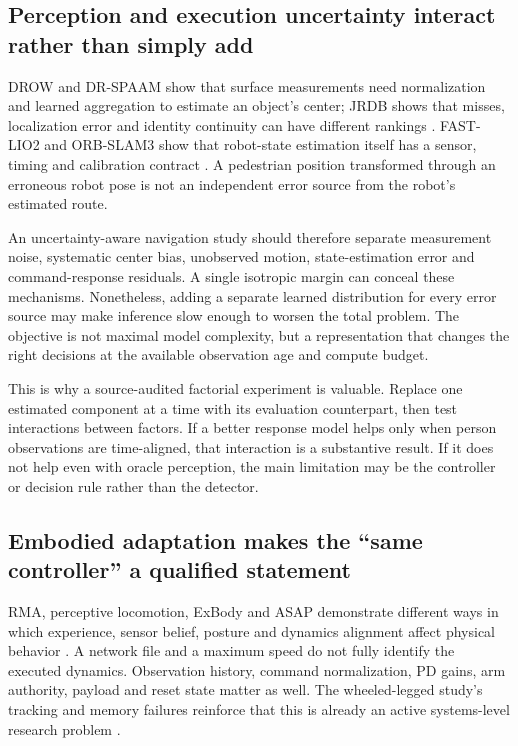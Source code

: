 \subsection{Perception and execution uncertainty interact rather than simply add}
DROW and DR-SPAAM show that surface measurements need normalization and learned
aggregation to estimate an object's center; JRDB shows that misses, localization
error and identity continuity can have different rankings
\citep{drow,drspaam,jrdb}. FAST-LIO2 and ORB-SLAM3 show that robot-state
estimation itself has a sensor, timing and calibration contract
\citep{fastlio,orbslam}. A pedestrian position transformed through an erroneous
robot pose is not an independent error source from the robot's estimated route.

An uncertainty-aware navigation study should therefore separate measurement
noise, systematic center bias, unobserved motion, state-estimation error and
command-response residuals. A single isotropic margin can conceal these
mechanisms. Nonetheless, adding a separate learned distribution for every error
source may make inference slow enough to worsen the total problem. The objective
is not maximal model complexity, but a representation that changes the right
decisions at the available observation age and compute budget.

This is why a source-audited factorial experiment is valuable. Replace one
estimated component at a time with its evaluation counterpart, then test
interactions between factors. If a better response model helps only when person
observations are time-aligned, that interaction is a substantive result. If it
does not help even with oracle perception, the main limitation may be the
controller or decision rule rather than the detector.

\subsection{Embodied adaptation makes the ``same controller'' a qualified statement}
RMA, perceptive locomotion, ExBody and ASAP demonstrate different ways in which
experience, sensor belief, posture and dynamics alignment affect physical
behavior \citep{rma,rough,expressive,asap}. A network file and a maximum speed
do not fully identify the executed dynamics. Observation history, command
normalization, PD gains, arm authority, payload and reset state matter as well.
The wheeled-legged study's tracking and memory failures reinforce that this is
already an active systems-level research problem \citep{wheeledleg}.

